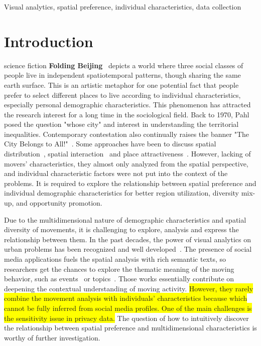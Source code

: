 \documentclass{ieeeaccess}
\begin{document}
\begin{keywords}
Visual analytics, spatial preference, individual characteristics, data collection
\end{keywords}

\titlepgskip=-15pt

\maketitle

\section{Introduction}
\label{sec:introduction}
 science fiction \textbf{Folding Beijing}~\cite{hao2016_foldingbeijing} depicts a world where three social classes of people live in independent spatiotemporal patterns, though sharing the same earth surface. This is an artistic metaphor for one potential fact that people prefer to select different places to live according to individual characteristics, especially personal demographic characteristics. This phenomenon has attracted the research interest for a long time in the sociological field. Back to 1970, Pahl~\cite{pahl1975whose} posed the question "whose city" and interest in understanding the territorial inequalities. Contemporary contestation also continually raises the banner "The City Belongs to All!"~\cite{Mayer2017_whosecity}. Some approaches have been to discuss spatial distribution~\cite{RN909}, spatial interaction~\cite{RN1692} and place attractiveness~\cite{retailcity}. However, lacking of movers' characteristics, they almost only analyzed from the spatial perspective, and individual characteristic factors were not put into the context of the problems. It is required to explore the relationship between spatial preference and individual demographic characteristics for better region utilization, diversity mix-up, and opportunity promotion.

Due to the multidimensional nature of demographic characteristics and spatial diversity of movements, it is challenging to explore, analysis and express the relationship between them. In the past decades, the power of visual analytics on urban problems has been recognized and well developed~\cite{wang2013visual, zeng2013visualizing}. The presence of social media applications fuels the spatial analysis with rich semantic texts, so researchers get the chances to explore the thematic meaning of the moving behavior, such as events~\cite{chen2017map} or topics~\cite{bosch2013scatterblogs2}. Those works essentially contribute on deepening the contextual understanding of moving activity. \colorbox{yellow}{However, they rarely combine the movement analysis with individuals' characteristics because which cannot be fully inferred from social media profiles. One of the main challenges is the sensitivity issue in privacy data.}
The question of how to intuitively discover the relationship between spatial preference and multidimensional characteristics is worthy of further investigation.
\end{document}

